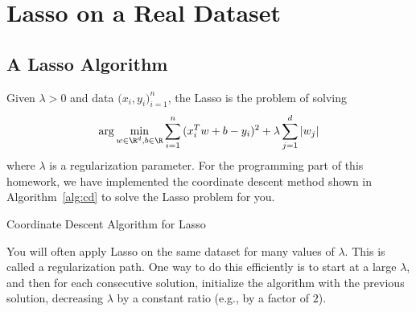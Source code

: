 \documentclass[shortlabels]{article}
\begin{document}
\newpage

\section*{Lasso on a Real Dataset}

\subsection*{A Lasso Algorithm}
Given $\lambda >0$ and data $\Big (x_i,y_i \Big)_{i=1}^n$, the Lasso is the problem of solving
\begin{equation*}\label{eq:lasso}
  \arg\min_{{w}\in \R^d, b \in \R} \sum_{i=1}^n { (x_i^T {w} + b - {y}_i)^2 }
    + \lambda \sum_{j=1}^d |{w}_j|
\end{equation*}
where $\lambda$ is a regularization parameter.
For the programming part of this homework, we have implemented the coordinate descent method shown in Algorithm~\ref{alg:cd} to solve the Lasso problem for you.

\begin{algorithm}[h]
    \caption{Coordinate Descent Algorithm for Lasso}\label{alg:cd}
\end{algorithm}

    You will often apply Lasso on the same dataset for many values of $\lambda$.  This
    is called a regularization path.  One way to do this efficiently is to start at a large $\lambda$, and then for each consecutive solution, initialize the algorithm with the previous solution, decreasing $\lambda$ by a constant ratio (e.g., by a factor of $2$).
\end{document}
